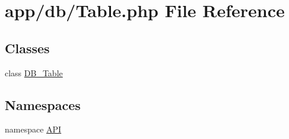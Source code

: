 \hypertarget{Table_8php}{
\section{app/db/Table.php File Reference}
\label{d7/de9/Table_8php}
}
\subsection*{Classes}
\begin{DoxyCompactItemize}
\item 
class \hyperlink{classDB__Table}{DB\_\-Table}
\end{DoxyCompactItemize}
\subsection*{Namespaces}
\begin{DoxyCompactItemize}
\item 
namespace \hyperlink{namespaceAPI}{API}
\end{DoxyCompactItemize}
